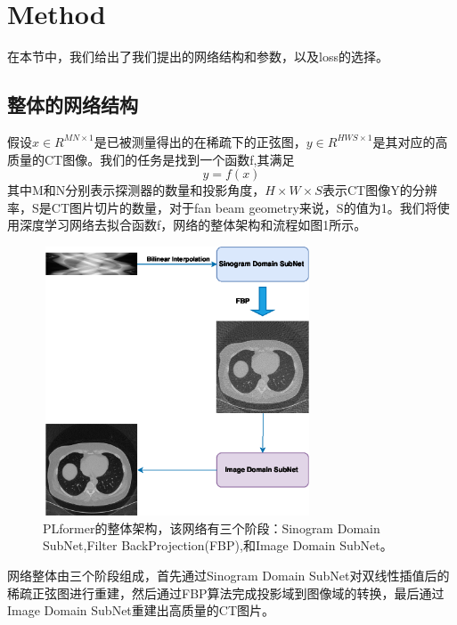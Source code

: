 \section{Method}
在本节中，我们给出了我们提出的网络结构和参数，以及loss的选择。
\subsection{整体的网络结构}
假设$x\in R^{MN \times{1}}$是已被测量得出的在稀疏下的正弦图，$y\in R^{HWS\times{1}}$是其对应的高质量的CT图像。我们的任务是找到一个函数f,其满足\begin{equation}y = f(x)\end{equation}其中M和N分别表示探测器的数量和投影角度，$H\times{W}\times{S}$表示CT图像Y的分辨率，S是CT图片切片的数量，对于fan beam geometry来说，S的值为1。我们将使用深度学习网络去拟合函数f，网络的整体架构和流程如图1所示。 \par
\begin{figure}
	\centering
	\includegraphics[height=8cm,width=8cm]{1.eps}
	\caption{PLformer的整体架构，该网络有三个阶段：Sinogram Domain SubNet,Filter BackProjection(FBP),和Image Domain SubNet。}
	\label{fig1}
\end{figure}
网络整体由三个阶段组成，首先通过Sinogram Domain SubNet对双线性插值后的稀疏正弦图进行重建，然后通过FBP\cite{kak2001principles}算法完成投影域到图像域的转换，最后通过Image Domain SubNet重建出高质量的CT图片。
